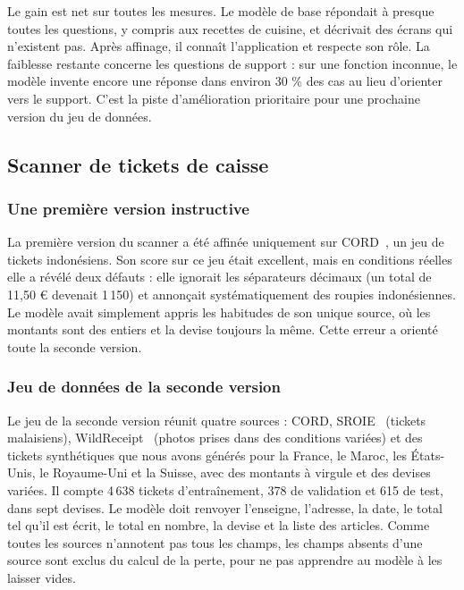 Le gain est net sur toutes les mesures. Le modèle de base répondait à presque toutes les
questions, y compris aux recettes de cuisine, et décrivait des écrans qui n'existent pas.
Après affinage, il connaît l'application et respecte son rôle. La faiblesse restante concerne
les questions de support : sur une fonction inconnue, le modèle invente encore une réponse
dans environ 30 \% des cas au lieu d'orienter vers le support. C'est la piste d'amélioration
prioritaire pour une prochaine version du jeu de données.

\subsection{Scanner de tickets de caisse}

\subsubsection{Une première version instructive}

La première version du scanner a été affinée uniquement sur CORD~\cite{cord}, un jeu de
tickets indonésiens. Son score sur ce jeu était excellent, mais en conditions réelles elle a
révélé deux défauts : elle ignorait les séparateurs décimaux (un total de 11,50 € devenait
1\,150) et annonçait systématiquement des roupies indonésiennes. Le modèle avait simplement
appris les habitudes de son unique source, où les montants sont des entiers et la devise
toujours la même. Cette erreur a orienté toute la seconde version.

\subsubsection{Jeu de données de la seconde version}

Le jeu de la seconde version réunit quatre sources : CORD, SROIE~\cite{sroie} (tickets
malaisiens), WildReceipt~\cite{wildreceipt} (photos prises dans des conditions variées) et
des tickets synthétiques que nous avons générés pour la France, le Maroc, les États-Unis, le
Royaume-Uni et la Suisse, avec des montants à virgule et des devises variées. Il compte
4\,638 tickets d'entraînement, 378 de validation et 615 de test, dans sept devises. Le modèle
doit renvoyer l'enseigne, l'adresse, la date, le total tel qu'il est écrit, le total en
nombre, la devise et la liste des articles. Comme toutes les sources n'annotent pas tous les
champs, les champs absents d'une source sont exclus du calcul de la perte, pour ne pas
apprendre au modèle à les laisser vides.

